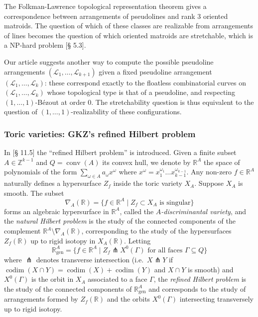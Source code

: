 \documentclass[11pt,reqno]{amsart}
\theoremstyle{plain}
\theoremstyle{definition}
\theoremstyle{remark}
\numberwithin{equation}{subsection}
\newcommand*{\bbR}{\mathbb{R}}
\newcommand*{\bbZ}{\mathbb{Z}}
\newcommand*{\calL}{\mathcal{L}}
\DeclareMathOperator{\codim}{codim}
\DeclareMathOperator{\conv}{conv}
\begin{document}
The Folkman-Lawrence topological representation theorem \cite{folkman1978oriented} gives a correspondence between arrangements of pseudolines and rank 3 oriented matroids. The question of which of these classes are realizable from arrangements of lines becomes the question of which oriented matroids are stretchable, which is a NP-hard problem \cite{toth2017handbook}[§ 5.3].

Our article suggests another way to compute the possible pseudoline arrangements $(\calL_1,\dots,\calL_{k+1})$ given a fixed pseudoline arrangement $(\calL_1,\dots,\calL_k)$: these correspond exactly to the floatless combinatorial curves on $(\calL_1,\dots,\calL_k)$ whose topological type is that of a pseudoline, and respecting $(1,\dots,1)$-Bézout at order 0. The stretchability question is thus equivalent to the question of $(1,\dots,1)$-realizability of these configurations.

\subsubsection{Toric varieties: GKZ's refined Hilbert problem}

In \cite{gelfand1994discriminants}[§ 11.5] the ``refined Hilbert problem'' is introduced. Given a finite subset $A\in\bbZ^{k-1}$ and $Q=\conv(A)$ its convex hull, we denote by $\bbR^A$ the space of polynomials of the form $\sum_{\omega\in A}a_\omega x^\omega$ where $x^\omega=x_1^{\omega_1}\dots x_{k-1}^{\omega_{k-1}}$. Any non-zero $f\in\bbR^A$ naturally defines a hypersurface $Z_f$ inside the toric variety $X_A$. Suppose $X_A$ is smooth. The subset
\[\nabla_A(\bbR)=\{f\in\bbR^A\mid\text{$Z_f\subset X_A$ is singular}\}\]
forms an algebraic hypersurface in $\bbR^A$, called the \textit{$A$-discriminantal variety}, and the \textit{natural Hilbert problem} is the study of the connected components of the complement $\bbR^A\setminus\nabla_A(\bbR)$, corresponding to the study of the hypersurfaces $Z_f(\bbR)$ up to rigid isotopy in $X_A(\bbR)$. Letting
\[\bbR^A_{\text{gen}}=\{f\in\bbR^A\mid Z_f\pitchfork X^0(\Gamma)\text{ for all faces $\Gamma\subseteq Q$}\}\]
where $\pitchfork$ denotes transverse intersection (i.e.\ $X\pitchfork Y$ if $\codim(X\cap Y)=\codim(X)+\codim(Y)$ and $X\cap Y$ is smooth) and $X^0(\Gamma)$ is the orbit in $X_A$ associated to a face $\Gamma$, the \textit{refined Hilbert problem} is the study of the connected components of $\bbR^A_{\text{gen}}$ and corresponds to the study of arrangements formed by $Z_f(\bbR)$ and the orbits $X^0(\Gamma)$ intersecting transversely up to rigid isotopy.
\end{document}

